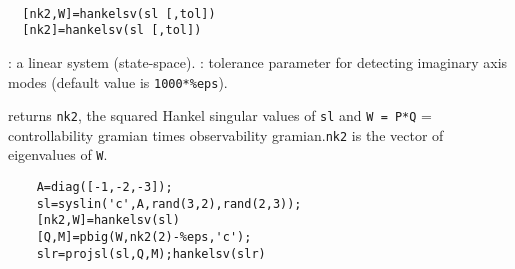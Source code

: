 \begin{mandesc}
   \\ %
\end{mandesc}
\begin{calling_sequence}
\begin{verbatim}
  [nk2,W]=hankelsv(sl [,tol])  
  [nk2]=hankelsv(sl [,tol])  
\end{verbatim}
\end{calling_sequence}
\begin{parameters}
  \begin{varlist}
    :  a linear system (state-space).
    : tolerance parameter for detecting imaginary axis modes 
    (default value is \verb!1000*%eps!).
  \end{varlist}
\end{parameters}
\begin{mandescription}
  returns \verb!nk2!, the squared Hankel singular values of \verb!sl!
  and \verb!W = P*Q! = controllability gramian times observability
  gramian.\verb!nk2! is the vector of eigenvalues of \verb!W!.
\end{mandescription}
\begin{examples}
  \begin{Verbatim}
    A=diag([-1,-2,-3]);
    sl=syslin('c',A,rand(3,2),rand(2,3));
    [nk2,W]=hankelsv(sl)
    [Q,M]=pbig(W,nk2(2)-%eps,'c');
    slr=projsl(sl,Q,M);hankelsv(slr)
  \end{Verbatim}
\end{examples}
\begin{manseealso}
      
\end{manseealso}
